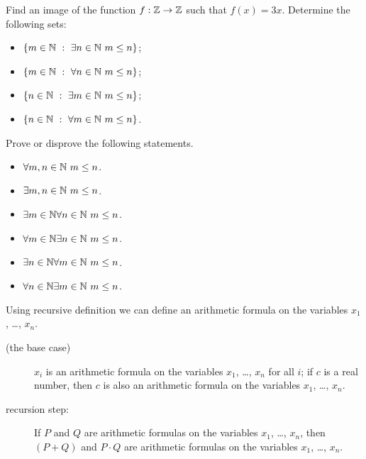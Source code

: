 \begin{chapterendexercises}
    \exercise Find an image of the function $f : \mathbb{Z} \to \mathbb{Z}$ such that
        $f(x) = 3x$.
    \exercise[recommended] Determine the following sets:
        \begin{itemize}
            \item $\set[\exists n \in \N \ m \le n]{m \in \N}$;
            \item $\set[\forall n \in \N \ m \le n]{m \in \N}$;
            \item $\set[\exists m \in \N \ m \le n]{n \in \N}$;
            \item $\set[\forall m \in \N \ m \le n]{n \in \N}$.
        \end{itemize}
    \exercise Prove or disprove the following statements.
        \begin{itemize}
            \item $\forall m, n \in \mathbb{N} \ m \le n$.
            \item $\exists m, n \in \mathbb{N} \ m \le n$.
            \item $\exists m \in \mathbb{N} \forall n \in \mathbb{N} \ m \le n$.
            \item $\forall m \in \mathbb{N} \exists n \in \mathbb{N} \ m \le n$.
            \item $\exists n \in \mathbb{N} \forall m \in \mathbb{N} \ m \le n$.
            \item $\forall n \in \mathbb{N} \exists m \in \mathbb{N} \ m \le n$.
        \end{itemize}

    \exercise[recommended]
        Using recursive definition we can define an arithmetic formula on the
        variables $x_1$, \dots, $x_n$.
        \begin{description}
            \item [(the base case)] $x_i$ is an arithmetic formula on the variables $x_1$,
                \dots, $x_n$ for all $i$; if $c$ is a real number, then $c$ is also
                an arithmetic formula on the variables $x_1$, \dots, $x_n$.
            \item[recursion step:] If $P$ and $Q$ are arithmetic formulas on the variables
                $x_1$, \dots, $x_n$, then $(P + Q)$ and $P \cdot Q$ are arithmetic formulas
                on the variables $x_1$, \dots, $x_n$.
        \end{description}


\end{chapterendexercises}
